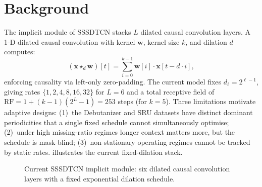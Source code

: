 \documentclass[12pt,a4paper]{article}
\newcommand{\RR}{\mathbb{R}}
\newcommand{\xv}{\mathbf{x}}
\newcommand{\wv}{\mathbf{w}}
\begin{document}
\setcounter{tocdepth}{1}
\tableofcontents
\clearpage

\section*{Background}
\vspace{-6pt}

The implicit module of SSSDTCN stacks $L$ dilated causal convolution layers.
A 1-D dilated causal convolution with kernel $\wv$, kernel size $k$, and
dilation $d$ computes:
\begin{equation}
  (\xv \star_d \wv)[t] = \sum_{i=0}^{k-1} \wv[i]\cdot\xv[t - d\cdot i],
  \label{eq:dconv}
\end{equation}
enforcing causality via left-only zero-padding. The current model fixes
$d_\ell = 2^{\ell-1}$, giving rates $\{1,2,4,8,16,32\}$ for $L=6$ and a
total receptive field of $\mathrm{RF} = 1+(k-1)(2^L-1)=253$ steps (for
$k=5$). Three limitations motivate adaptive designs: (1)~the Debutanizer and
SRU datasets have distinct dominant periodicities that a single fixed schedule
cannot simultaneously optimise; (2)~under high missing-ratio regimes longer
context matters more, but the schedule is mask-blind; (3)~non-stationary
operating regimes cannot be tracked by static rates.
 illustrates the current fixed-dilation stack.

\begin{figure}[ht]
  \centering
  \caption{Current SSSDTCN implicit module: six dilated causal convolution
           layers with a fixed exponential dilation schedule.}
  \label{fig:current}
\end{figure}
\end{document}
